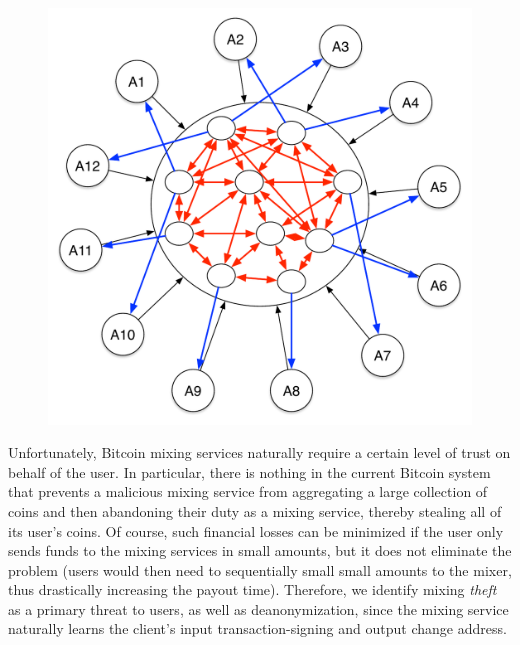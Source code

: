 \begin{figure}
\begin{center}
\includegraphics[scale=0.35]{images/mix_bitcoin.pdf}
\label{TODO.}
\label{fig:mix-design}
\end{center}
\end{figure}

Unfortunately, Bitcoin mixing services naturally require a certain level of trust on behalf of the user. In particular, there is nothing in the current Bitcoin system that prevents a malicious mixing service from aggregating a large collection of coins and then abandoning their duty as a mixing service, thereby stealing all of its user's coins. Of course, such financial losses can be minimized if the user only sends funds to the mixing services in small amounts, but it does not eliminate the problem (users would then need to sequentially small small amounts to the mixer, thus drastically increasing the payout time). Therefore, we identify mixing \emph{theft} as a primary threat to users, as well as deanonymization, since the mixing service naturally learns the client's input transaction-signing and output change address.

